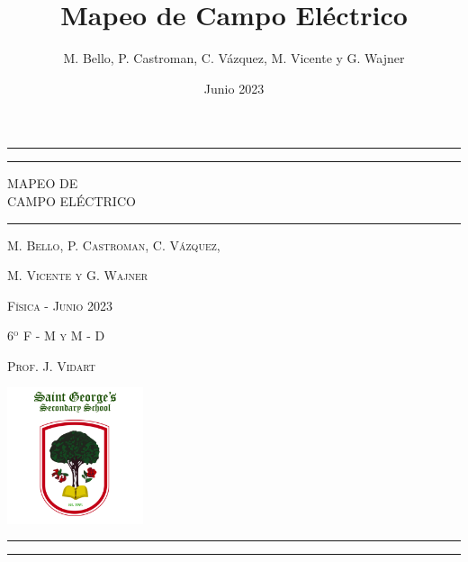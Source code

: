 \documentclass{article}
\title{Mapeo de Campo Eléctrico}
\author{M. Bello, P. Castroman, C. Vázquez, M. Vicente y G. Wajner}
\date{Junio 2023}
\begin{document}
\begin{titlepage}
	
	\centering
	
	\rule{\textwidth}{1pt}
	\vspace{2pt}\vspace{-\baselineskip}
	\rule{\textwidth}{0.4pt}

	\vspace{0.1\textheight}
	
	{\Huge MAPEO DE}\\[0.5\baselineskip]
	{\Huge CAMPO ELÉCTRICO}
	
	\vspace{0.025\textheight}
	
	\rule{0.3\textwidth}{0.4pt}
	
	\vspace{0.037\textheight}
	{\Large \textsc{M. Bello, P. Castroman, C. Vázquez,}}

  \vspace{0.1cm}

  {\Large \textsc{M. Vicente y G. Wajner}}

  \vfill
	
  \large\textsc{Física - Junio 2023}

  \vspace{-0.2cm}

  \large\textsc{6$^{\text{o}}$ F - M y M - D}

  \vspace{-0.2cm}

  \large\textsc{Prof. J. Vidart}

  \vspace{0.05\textheight}

	\includegraphics[width=0.3\textwidth]{logo.jpg}
	
  \vspace{0.08\textheight}

	\rule{\textwidth}{0.4pt}
	
	\vspace{2pt}\vspace{-\baselineskip}
	
	\rule{\textwidth}{1pt}
	
\end{titlepage}
\end{document}
